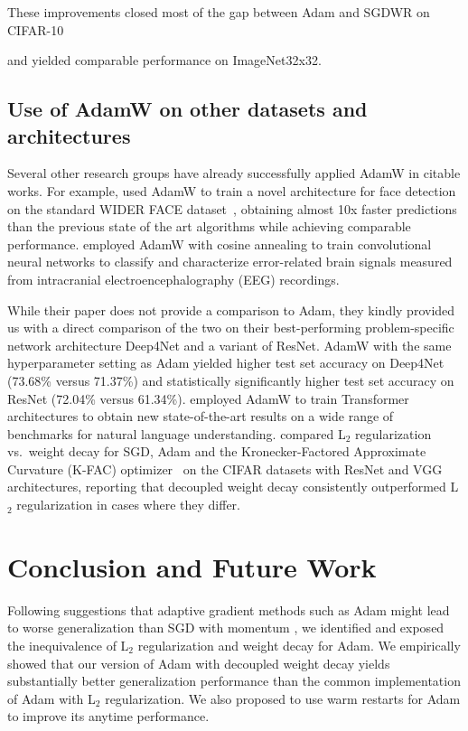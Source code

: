These improvements closed most of the gap between Adam and SGDWR on CIFAR-10 

and yielded comparable performance on ImageNet32x32. 

\subsection{Use of AdamW on other datasets and architectures}

Several other research groups have already successfully applied AdamW in citable works. For example, \citet{2018arXiv180406559W} used AdamW to train a novel architecture for face detection on the standard WIDER FACE dataset~\citep{yang2016wider}, obtaining almost 10x faster predictions than the previous state of the art algorithms while achieving comparable performance. 
\citet{volker2018intracranial} employed AdamW with cosine annealing to train convolutional neural networks to classify and characterize error-related brain signals measured from intracranial electroencephalography (EEG) recordings.

While their paper does not provide a comparison to Adam, they kindly provided us with a direct comparison of the two on their best-performing problem-specific network architecture Deep4Net and a variant of ResNet. AdamW  with the same hyperparameter setting as Adam yielded higher test set accuracy on Deep4Net (73.68\% versus 71.37\%) and statistically significantly higher test set accuracy on ResNet (72.04\% versus 61.34\%). 
\citet{radford2018improving} employed AdamW to train Transformer~\citep{vaswani2017attention} architectures to obtain new state-of-the-art results on a wide range of benchmarks for natural language understanding. \citet{zhang2018three} compared L$_2$ regularization vs.\ weight decay for SGD, Adam and the Kronecker-Factored Approximate Curvature (K-FAC) optimizer~\citep{martens2015optimizing} on the CIFAR datasets with ResNet and VGG architectures, reporting that decoupled weight decay consistently outperformed L$_2$ regularization in cases where they differ. 

\section{Conclusion and Future Work}

Following suggestions that adaptive gradient methods such as Adam might lead to worse generalization than SGD with momentum \citep{wilson2017marginal}, we identified and exposed the inequivalence of L$_2$ regularization and weight decay for Adam. We empirically showed that our version of Adam with decoupled weight decay yields substantially better generalization performance than the common implementation of Adam with L$_2$ regularization. We also proposed to use warm restarts for Adam to improve its anytime  performance. 

